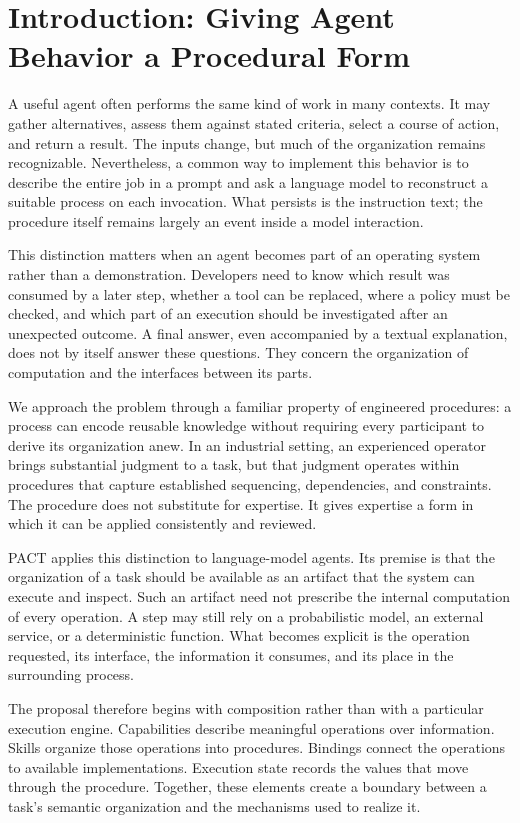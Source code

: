 \documentclass[10pt,twocolumn,a4paper]{article}
\begin{document}
\section{Introduction: Giving Agent Behavior a Procedural Form}

A useful agent often performs the same kind of work in many contexts. It may gather alternatives, assess them against stated criteria, select a course of action, and return a result. The inputs change, but much of the organization remains recognizable. Nevertheless, a common way to implement this behavior is to describe the entire job in a prompt and ask a language model to reconstruct a suitable process on each invocation. What persists is the instruction text; the procedure itself remains largely an event inside a model interaction.


This distinction matters when an agent becomes part of an operating system rather than a demonstration. Developers need to know which result was consumed by a later step, whether a tool can be replaced, where a policy must be checked, and which part of an execution should be investigated after an unexpected outcome. A final answer, even accompanied by a textual explanation, does not by itself answer these questions. They concern the organization of computation and the interfaces between its parts.


We approach the problem through a familiar property of engineered procedures: a process can encode reusable knowledge without requiring every participant to derive its organization anew. In an industrial setting, an experienced operator brings substantial judgment to a task, but that judgment operates within procedures that capture established sequencing, dependencies, and constraints. The procedure does not substitute for expertise. It gives expertise a form in which it can be applied consistently and reviewed.


PACT applies this distinction to language-model agents. Its premise is that the organization of a task should be available as an artifact that the system can execute and inspect. Such an artifact need not prescribe the internal computation of every operation. A step may still rely on a probabilistic model, an external service, or a deterministic function. What becomes explicit is the operation requested, its interface, the information it consumes, and its place in the surrounding process.


The proposal therefore begins with composition rather than with a particular execution engine. Capabilities describe meaningful operations over information. Skills organize those operations into procedures. Bindings connect the operations to available implementations. Execution state records the values that move through the procedure. Together, these elements create a boundary between a task's semantic organization and the mechanisms used to realize it.
\end{document}
